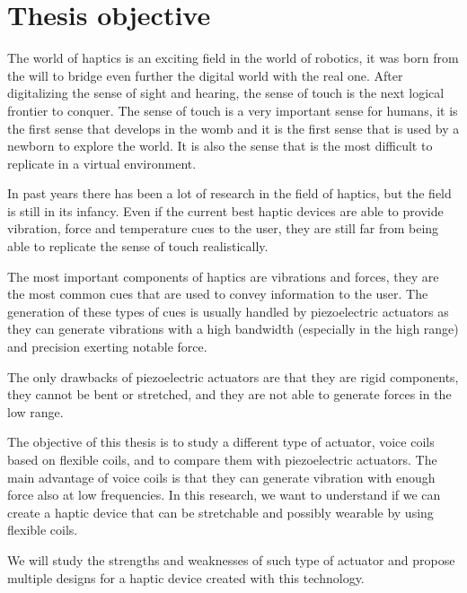 \section{Thesis objective}

The world of haptics is an exciting field in the world of robotics, it was born from the will to bridge even further the digital world with the real one.
After digitalizing the sense of sight and hearing, the sense of touch is the next logical frontier to conquer.
The sense of touch is a very important sense for humans, it is the first sense that develops in the womb and it is the first sense that is used by a newborn to explore the world.
It is also the sense that is the most difficult to replicate in a virtual environment.

In past years there has been a lot of research in the field of haptics, but the field is still in its infancy.
Even if the current best haptic devices are able to provide vibration, force and temperature cues to the user, they are still far from being able to replicate the sense of touch realistically.

The most important components of haptics are vibrations and forces, they are the most common cues that are used to convey information to the user.
The generation of these types of cues is usually handled by piezoelectric actuators as they can generate vibrations with a high bandwidth (especially in the high range) and precision exerting notable force.

The only drawbacks of piezoelectric actuators are that they are rigid components, they cannot be bent or stretched, and they are not able to generate forces in the low range.

The objective of this thesis is to study a different type of actuator, voice coils based on flexible coils, and to compare them with piezoelectric actuators.
The main advantage of voice coils is that they can generate vibration with enough force also at low frequencies. 
In this research, we want to understand if we can create a haptic device that can be stretchable and possibly wearable by using flexible coils.

We will study the strengths and weaknesses of such type of actuator and propose multiple designs for a haptic device created with this technology.